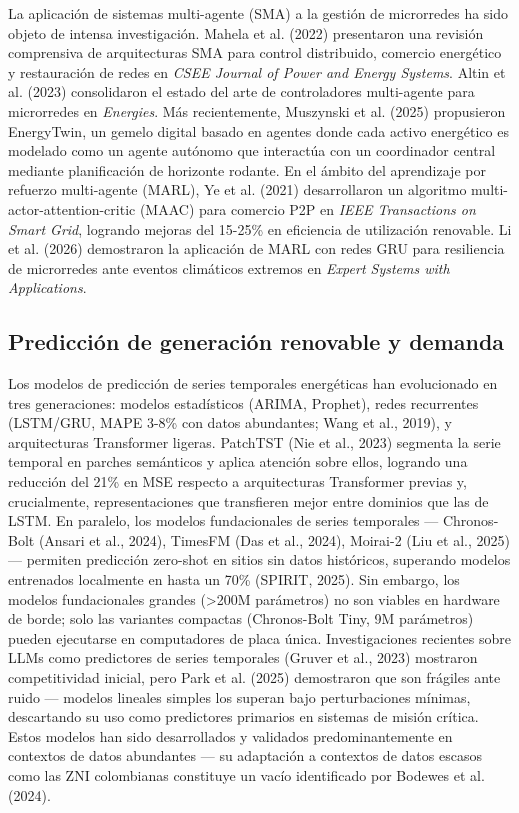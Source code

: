 \documentclass[12pt,letterpaper]{article}
\begin{document}
La aplicaci\'on de sistemas multi-agente (SMA) a la gesti\'on de microrredes ha sido objeto de intensa investigaci\'on. Mahela et al. (2022) presentaron una revisi\'on comprensiva de arquitecturas SMA para control distribuido, comercio energ\'etico y restauraci\'on de redes en \textit{CSEE Journal of Power and Energy Systems}. Altin et al. (2023) consolidaron el estado del arte de controladores multi-agente para microrredes en \textit{Energies}. M\'as recientemente, Muszynski et al. (2025) propusieron EnergyTwin, un gemelo digital basado en agentes donde cada activo energ\'etico es modelado como un agente aut\'onomo que interact\'ua con un coordinador central mediante planificaci\'on de horizonte rodante. En el \'ambito del aprendizaje por refuerzo multi-agente (MARL), Ye et al. (2021) desarrollaron un algoritmo multi-actor-attention-critic (MAAC) para comercio P2P en \textit{IEEE Transactions on Smart Grid}, logrando mejoras del 15-25\% en eficiencia de utilizaci\'on renovable. Li et al. (2026) demostraron la aplicaci\'on de MARL con redes GRU para resiliencia de microrredes ante eventos clim\'aticos extremos en \textit{Expert Systems with Applications}.

\subsection*{Predicci\'on de generaci\'on renovable y demanda}

Los modelos de predicci\'on de series temporales energ\'eticas han evolucionado en tres generaciones: modelos estad\'isticos (ARIMA, Prophet), redes recurrentes (LSTM/GRU, MAPE 3-8\% con datos abundantes; Wang et al., 2019), y arquitecturas Transformer ligeras. PatchTST (Nie et al., 2023) segmenta la serie temporal en parches sem\'anticos y aplica atenci\'on sobre ellos, logrando una reducci\'on del 21\% en MSE respecto a arquitecturas Transformer previas y, crucialmente, representaciones que transfieren mejor entre dominios que las de LSTM. En paralelo, los modelos fundacionales de series temporales --- Chronos-Bolt (Ansari et al., 2024), TimesFM (Das et al., 2024), Moirai-2 (Liu et al., 2025) --- permiten predicci\'on zero-shot en sitios sin datos hist\'oricos, superando modelos entrenados localmente en hasta un 70\% (SPIRIT, 2025). Sin embargo, los modelos fundacionales grandes (>200M par\'ametros) no son viables en hardware de borde; solo las variantes compactas (Chronos-Bolt Tiny, 9M par\'ametros) pueden ejecutarse en computadores de placa \'unica. Investigaciones recientes sobre LLMs como predictores de series temporales (Gruver et al., 2023) mostraron competitividad inicial, pero Park et al. (2025) demostraron que son fr\'agiles ante ruido --- modelos lineales simples los superan bajo perturbaciones m\'inimas, descartando su uso como predictores primarios en sistemas de misi\'on cr\'itica. Estos modelos han sido desarrollados y validados predominantemente en contextos de datos abundantes --- su adaptaci\'on a contextos de datos escasos como las ZNI colombianas constituye un vac\'io identificado por Bodewes et al. (2024).
\end{document}
